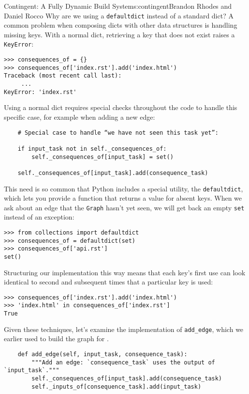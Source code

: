 \begin{aosachapter}{Contingent: A Fully Dynamic Build System}{s:contingent}{Brandon Rhodes and Daniel Rocco}
Why are we using a \texttt{defaultdict} instead of a standard dict? A
common problem when composing dicts with other data structures is
handling missing keys. With a normal dict, retrieving a key that does
not exist raises a \texttt{KeyError}:

\begin{verbatim}
>>> consequences_of = {}
>>> consequences_of['index.rst'].add('index.html')
Traceback (most recent call last):
     ...
KeyError: 'index.rst'
\end{verbatim}

Using a normal dict requires special checks throughout the code to
handle this specific case, for example when adding a new edge:

\begin{verbatim}
    # Special case to handle “we have not seen this task yet”:

    if input_task not in self._consequences_of:
        self._consequences_of[input_task] = set()

    self._consequences_of[input_task].add(consequence_task)
\end{verbatim}

This need is so common that Python includes a special utility, the
\texttt{defaultdict}, which lets you provide a function that returns a
value for absent keys. When we ask about an edge that the \texttt{Graph}
hasn't yet seen, we will get back an empty \texttt{set} instead of an
exception:

\begin{verbatim}
>>> from collections import defaultdict
>>> consequences_of = defaultdict(set)
>>> consequences_of['api.rst']
set()
\end{verbatim}

Structuring our implementation this way means that each key's first use
can look identical to second and subsequent times that a particular key
is used:

\begin{verbatim}
>>> consequences_of['index.rst'].add('index.html')
>>> 'index.html' in consequences_of['index.rst']
True
\end{verbatim}

Given these techniques, let's examine the implementation of
\texttt{add\_edge}, which we earlier used to build the graph for
.

\begin{verbatim}
    def add_edge(self, input_task, consequence_task):
        """Add an edge: `consequence_task` uses the output of `input_task`."""
        self._consequences_of[input_task].add(consequence_task)
        self._inputs_of[consequence_task].add(input_task)
\end{verbatim}


\end{aosachapter}
